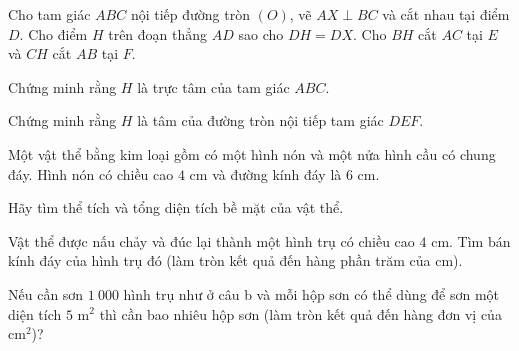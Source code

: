 \begin{practice}
\begin{questions}[resume=SBT]
        \item Cho tam giác $ABC$ nội tiếp đường tròn $(O)$, vẽ $AX\perp BC$ và cắt nhau tại điểm $D$. Cho điểm $H$ trên đoạn thẳng $AD$ sao cho $DH=DX$. Cho $BH$ cắt $AC$ tại $E$ và $CH$ cắt $AB$ tại $F$.
        \begin{questions}
            \item Chứng minh rằng $H$ là trực tâm của tam giác $ABC$.
            \answerline
            \answerline
            \item Chứng minh rằng $H$ là tâm của đường tròn nội tiếp tam giác $DEF$.
            \answerline
            \answerline
        \end{questions}

        \item Một vật thể bằng kim loại gồm có một hình nón và một nửa hình cầu có chung đáy. Hình nón có chiều cao $4$ cm và đường kính đáy là $6$ cm.

        \begin{center}
        \end{center}

        \begin{questions}
            \item Hãy tìm thể tích và tổng diện tích bề mặt của vật thể.
            \answerline
            \answerline
            \item Vật thể được nấu chảy và đúc lại thành một hình trụ có chiều cao $4$ cm. Tìm bán kính đáy của hình trụ đó (làm tròn kết quả đến hàng phần trăm của cm).
            \answerline
            \answerline
            \item Nếu cần sơn $1\ 000$ hình trụ như ở câu b và mỗi hộp sơn có thể dùng để sơn một diện tích $5$ m$^2$ thì cần bao nhiêu hộp sơn (làm tròn kết quả đến hàng đơn vị của cm$^2$)?
            \answerline
            \answerline
        \end{questions}
    \end{questions}


\end{practice}
